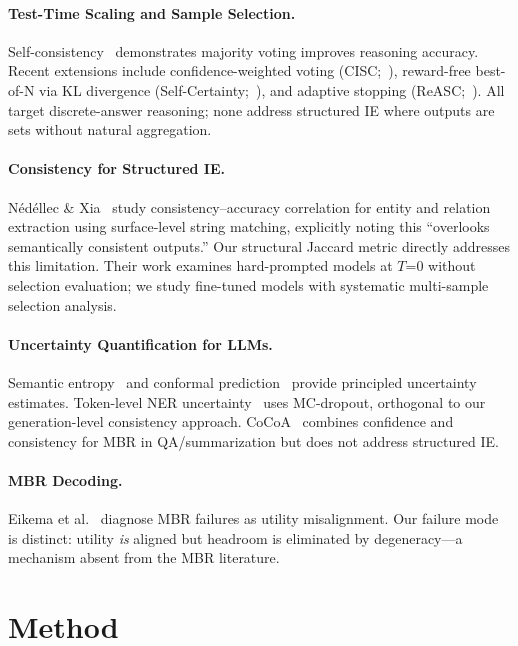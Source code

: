 \documentclass[11pt]{article}
\begin{document}
\paragraph{Test-Time Scaling and Sample Selection.}
Self-consistency~\cite{wang2023selfconsistency} demonstrates majority voting improves reasoning accuracy. Recent extensions include confidence-weighted voting (CISC;~\citealp{cisc2025}), reward-free best-of-N via KL divergence (Self-Certainty;~\citealp{selfcertainty2026}), and adaptive stopping (ReASC;~\citealp{reasc2026}). All target discrete-answer reasoning; none address structured IE where outputs are sets without natural aggregation.

\paragraph{Consistency for Structured IE.}
N\'ed\'ellec \& Xia~ study consistency--accuracy correlation for entity and relation extraction using surface-level string matching, explicitly noting this ``overlooks semantically consistent outputs.'' Our structural Jaccard metric directly addresses this limitation. Their work examines hard-prompted models at $T$=0 without selection evaluation; we study fine-tuned models with systematic multi-sample selection analysis.

\paragraph{Uncertainty Quantification for LLMs.}
Semantic entropy~\cite{kuhn2023semantic} and conformal prediction~\cite{fisch2021conformal,angelopoulos2021conformal} provide principled uncertainty estimates. Token-level NER uncertainty~\cite{shelmanov2021uncertainty} uses MC-dropout, orthogonal to our generation-level consistency approach. CoCoA~\cite{vashurin2025cocoa} combines confidence and consistency for MBR in QA/summarization but does not address structured IE.

\paragraph{MBR Decoding.}
Eikema et al.~ diagnose MBR failures as utility misalignment. Our failure mode is distinct: utility \emph{is} aligned but headroom is eliminated by degeneracy---a mechanism absent from the MBR literature.

\section{Method}
\end{document}
